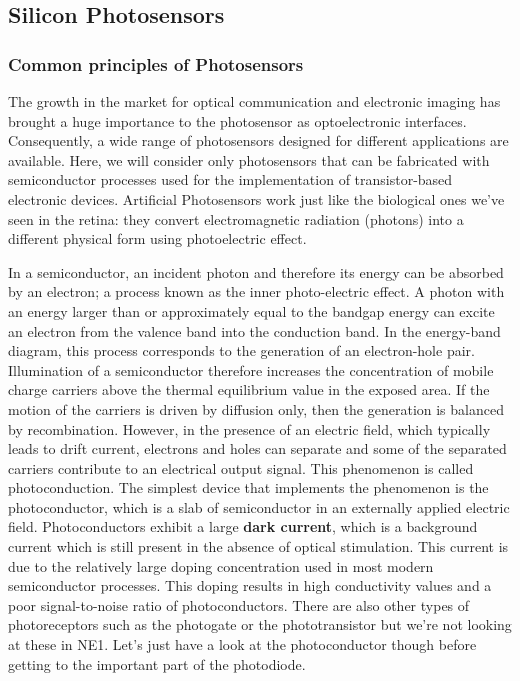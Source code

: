 \subsection{Silicon Photosensors}

\subsubsection{Common principles of Photosensors}

The growth in the market for optical communication and electronic imaging has brought a huge importance to the photosensor as optoelectronic interfaces. Consequently, a wide range of photosensors designed for different applications are available. Here, we will consider only photosensors that can be fabricated with semiconductor processes used for the implementation of transistor-based electronic devices. 
Artificial Photosensors work just like the biological ones we've seen in the retina: they convert electromagnetic radiation (photons) into a different physical form using photoelectric effect. 

In a semiconductor, an incident photon and therefore its energy can be absorbed by an electron; a process known as the inner photo-electric effect. A
photon with an energy larger than or approximately equal to the bandgap energy can excite an electron from the valence band into the conduction band.
In the energy-band diagram, this process corresponds to the generation of an
electron-hole pair. Illumination of a semiconductor therefore increases the concentration of mobile charge carriers above the thermal equilibrium value in
the exposed area. If the motion of the carriers is driven by diffusion only, then the
generation is balanced by recombination. However, in the presence of an electric field, which typically leads to drift current, electrons and holes can separate and some of the separated carriers contribute to an electrical output signal. This phenomenon is called photoconduction. The simplest device that implements the phenomenon is the photoconductor, which is a slab of semiconductor in an externally applied electric
field. Photoconductors exhibit a large \textbf{dark current}, which is a background current which is still present in the absence of optical stimulation. This current is
due to the relatively large doping concentration used in most modern semiconductor processes. This doping results in high conductivity values and a poor signal-to-noise ratio of photoconductors. There are also other types of photoreceptors such as the photogate or the phototransistor but we're not looking at these in NE1. Let's just have a look at the photoconductor though before getting to the important part of the photodiode. 

